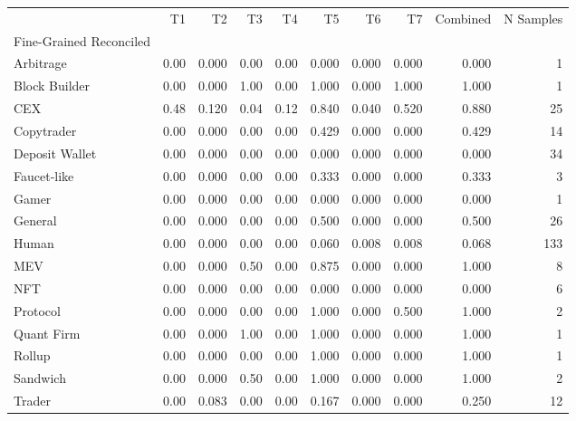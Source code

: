 \begin{tabular}{lrrrrrrrrr}
\toprule
{} &    T1 &     T2 &    T3 &    T4 &     T5 &     T6 &     T7 &  Combined &  N Samples \\
Fine-Grained Reconciled &       &        &       &       &        &        &        &           &            \\
\midrule
Arbitrage               &  0.00 &  0.000 &  0.00 &  0.00 &  0.000 &  0.000 &  0.000 &     0.000 &          1 \\
Block Builder           &  0.00 &  0.000 &  1.00 &  0.00 &  1.000 &  0.000 &  1.000 &     1.000 &          1 \\
CEX                     &  0.48 &  0.120 &  0.04 &  0.12 &  0.840 &  0.040 &  0.520 &     0.880 &         25 \\
Copytrader              &  0.00 &  0.000 &  0.00 &  0.00 &  0.429 &  0.000 &  0.000 &     0.429 &         14 \\
Deposit Wallet          &  0.00 &  0.000 &  0.00 &  0.00 &  0.000 &  0.000 &  0.000 &     0.000 &         34 \\
Faucet-like             &  0.00 &  0.000 &  0.00 &  0.00 &  0.333 &  0.000 &  0.000 &     0.333 &          3 \\
Gamer                   &  0.00 &  0.000 &  0.00 &  0.00 &  0.000 &  0.000 &  0.000 &     0.000 &          1 \\
General                 &  0.00 &  0.000 &  0.00 &  0.00 &  0.500 &  0.000 &  0.000 &     0.500 &         26 \\
Human                   &  0.00 &  0.000 &  0.00 &  0.00 &  0.060 &  0.008 &  0.008 &     0.068 &        133 \\
MEV                     &  0.00 &  0.000 &  0.50 &  0.00 &  0.875 &  0.000 &  0.000 &     1.000 &          8 \\
NFT                     &  0.00 &  0.000 &  0.00 &  0.00 &  0.000 &  0.000 &  0.000 &     0.000 &          6 \\
Protocol                &  0.00 &  0.000 &  0.00 &  0.00 &  1.000 &  0.000 &  0.500 &     1.000 &          2 \\
Quant Firm              &  0.00 &  0.000 &  1.00 &  0.00 &  1.000 &  0.000 &  0.000 &     1.000 &          1 \\
Rollup                  &  0.00 &  0.000 &  0.00 &  0.00 &  1.000 &  0.000 &  0.000 &     1.000 &          1 \\
Sandwich                &  0.00 &  0.000 &  0.50 &  0.00 &  1.000 &  0.000 &  0.000 &     1.000 &          2 \\
Trader                  &  0.00 &  0.083 &  0.00 &  0.00 &  0.167 &  0.000 &  0.000 &     0.250 &         12 \\
\bottomrule
\end{tabular}

